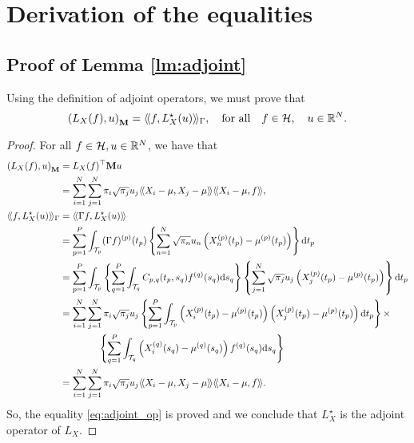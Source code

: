 \section{Derivation of the equalities} %
\label{sec:derivation_of_the_inertia_of_the_clouds}

\subsection{Proof of Lemma \ref{lm:adjoint}} %
\label{sub:proof_of_lemma_lm:adjoint}

Using the definition of adjoint operators, we must prove that
\begin{equation}\label{eq:adjoint_op}
    \left(L_X(f), u\right)_{\mathbf{M}} = \langle\!\langle f, L^\star_X(u)\rangle\!\rangle_\Gamma, \quad\text{for all}\quad f \in \mathcal{H},\quad u \in \mathbb{R}^N.
\end{equation}

\begin{proof}
For all $f \in \mathcal{H}, u \in \mathbb{R}^N$, we have that
\begin{align*}
    \inRM{L_X(f)}{u} &= L_X(f)^\top \mathbf{M} u \\
    &= \sum_{i = 1}^N\sum_{j = 1}^N \pi_i \sqrt{\pi_j} u_j \inH{X_i - \mu}{X_j - \mu}\inH{X_i - \mu}{f}, \\
    \inHG{f}{L^\star_X(u)} &= \inH{\Gamma f}{L^\star_X(u)} \\
    &= \sum_{p = 1}^P \int_{\TT{p}} (\Gamma f)^{(p)}(t_p) \left\{ \sum_{n = 1}^N \sqrt{\pi_n} u_n \left(\Xnp(t_p) - \mup{p}(t_p)\right) \right\} \dd t_p \\
    &= \sum_{p = 1}^P \int_{\TT{p}} \left\{\sum_{q = 1}^P \int_{\TT{q}} C_{p,q}(t_p, s_q)f^{(q)}(s_q) \dd s_q\right\} \left\{ \sum_{j = 1}^N \sqrt{\pi_j} u_j \left(X_j^{(p)}(t_p) - \mup{p}(t_p)\right) \right\} \dd t_p \\
    &= \sum_{i = 1}^N \sum_{j = 1}^N \pi_i \sqrt{\pi_j} u_j \left\{\sum_{p = 1}^P \int_{\TT{p}} \left(X_i^{(p)}(t_p) - \mup{p}(t_p)\right)\left(X_j^{(p)}(t_p) - \mup{p}(t_p)\right)\dd t_p\right\} \times \\
    &\qquad\qquad \left\{\sum_{q = 1}^P \int_{\TT{q}} \left(X_i^{(q)}(s_q) - \mup{q}(s_q)\right)f^{(q)}(s_q)\dd s_q\right\} \\
    &= \sum_{i = 1}^N\sum_{j = 1}^N \pi_i \sqrt{\pi_j} u_j \inH{X_i - \mu}{X_j - \mu}\inH{X_i - \mu}{f}.
\end{align*}
So, the equality \eqref{eq:adjoint_op} is proved and we conclude that $L^\star_X$ is the adjoint operator of $L_X$.    
\end{proof}

